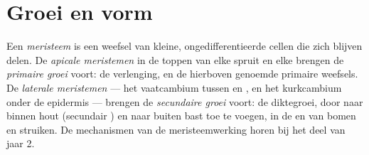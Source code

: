 \section{Groei en vorm}

\begin{definition}\label{def:b1:flowering-plant-organization:meristem}
Een \emph{meristeem} is een weefsel van kleine,
ongedifferentieerde cellen die zich blijven delen. De \emph{apicale
meristemen} in de toppen van elke spruit en elke 
brengen de \emph{primaire groei} voort: de verlenging, en
de hierboven genoemde primaire weefsels. De \emph{laterale
meristemen} --- het vaatcambium tussen  en
, en het kurkcambium onder de epidermis --- brengen de \emph{secundaire
groei} voort: de diktegroei, door naar binnen hout
(secundair ) en naar buiten bast toe te voegen, in de  en 
van bomen en struiken. De mechanismen van de meristeemwerking horen bij het deel
van jaar 2.
\end{definition}

